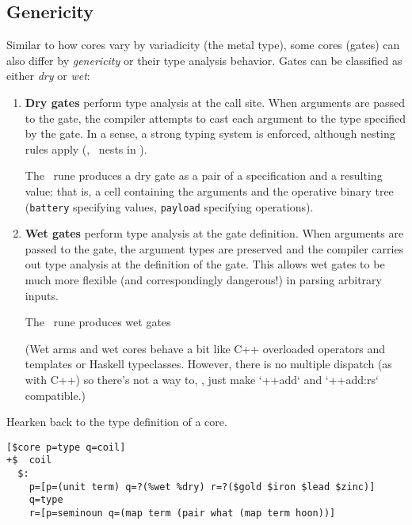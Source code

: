 \subsection{Genericity}

Similar to how cores vary by variadicity (the metal type), some cores (gates) can also differ by \emph{genericity} or their type analysis behavior.  Gates can be classified as either \emph{dry} or \emph{wet}:

\begin{enumerate}
  \item  \textbf{Dry gates} perform type analysis at the call site.  When arguments are passed to the gate, the compiler attempts to cast each argument to the type specified by the gate.  In a sense, a strong typing system is enforced, although nesting rules apply (\eg, \patud~nests in \patu).

    The \pbartis~rune produces a dry gate as a pair of a specification and a resulting value:  that is, a cell containing the arguments and the operative binary tree (\texttt{battery} specifying values, \texttt{payload} specifying operations).

  \item  \textbf{Wet gates} perform type analysis at the gate definition.  When arguments are passed to the gate, the argument types are preserved and the compiler carries out type analysis at the definition of the gate.  This allows wet gates to be much more flexible (and correspondingly dangerous!) in parsing arbitrary inputs.

    The \bartar~rune produces wet gates

    \marginnote[2mm](Wet arms and wet cores behave a bit like C++ overloaded operators and templates or Haskell typeclasses.  However, there is no multiple dispatch (as with C++) so there's not a way to, \eg, just make `++add` and `++add:rs` compatible.)
\end{enumerate}

Hearken back to the type definition of a core.

\begin{lstlisting}
[$core p=type q=coil]
+$  coil
  $:
    p=[p=(unit term) q=?(%wet %dry) r=?($gold $iron $lead $zinc)]
    q=type
    r=[p=seminoun q=(map term (pair what (map term hoon))]
\end{lstlisting}

